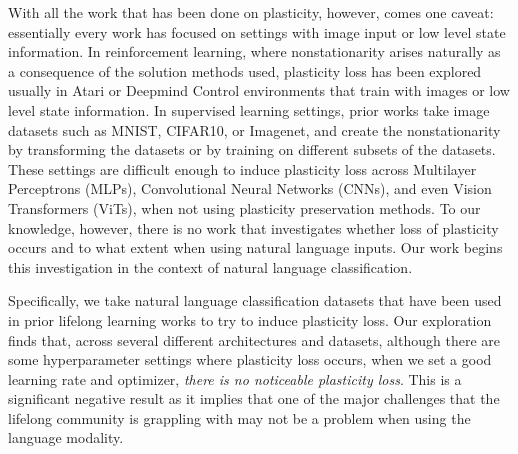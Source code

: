 With all the work that has been done on plasticity, however, comes one caveat:
essentially every work has focused on settings with image input or low level state
information. In reinforcement learning, where nonstationarity arises naturally
as a consequence of the solution methods used, plasticity loss has been explored usually
in Atari or Deepmind Control environments that train with images or low level state
information. In supervised learning settings, prior works take image datasets such as
MNIST, CIFAR10, or Imagenet, and create the nonstationarity by transforming the datasets
or by training on different subsets of the datasets. These settings are difficult enough
to induce plasticity loss across Multilayer Perceptrons (MLPs), Convolutional Neural
Networks (CNNs), and even Vision
Transformers (ViTs), when not using plasticity preservation methods.
To our knowledge, however, there is no work that investigates whether loss of plasticity occurs
and to what extent when using natural language inputs. Our work begins this investigation
in the context of natural language classification.

Specifically, we take natural language classification datasets that have been used in
prior lifelong learning works to try to induce plasticity loss. Our exploration finds
that, across several different architectures and datasets, although there are some
hyperparameter settings where plasticity loss occurs, when
we set a good learning rate and optimizer, \emph{there is no noticeable plasticity
    loss}. This is a significant negative result as it implies that one of the major
challenges that the lifelong community is grappling with may not be a problem when using
the language modality.